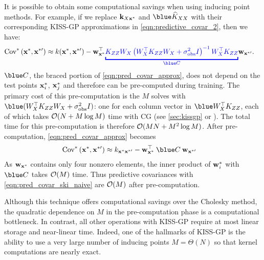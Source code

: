 It is possible to obtain some computational savings when using inducing point methods.
For example, if we replace $\mathbf{k}_{X \mathbf{x}^*}$ and $\blue \trainK$ with their corresponding KISS-GP approximations in \cref{eqn:predictive_covar_2}, then we have:
%
\begin{align}
  \covtest{\bxtest}{\bxtestprime}
  &\approx
  k(\bxtest, \bxtestprime) -
  \bw_{\bxtest}^{\top} {\color{blue}\underbracket{{\bK_{\bZ\bZ} \bW_{\bX} \left( \bW^\top_{\bX} \bK_{\bZ\bZ} \bW_\bX + \sigma^2_\text{obs} \bI \right)^{-1} \bW^\top_{\bX} \bK_{\bZ \bZ}}}_{\blue \bC}} \bw_{\bxtestprime}.
  \label{eqn:pred_covar_approx}
\end{align}
%
$\blue \bC$, the braced portion of \cref{eqn:pred_covar_approx}, does not depend on the test points $\mathbf{x}^*_{i}$, $\mathbf{x}^*_{j}$ and therefore can be pre-computed during training.
The primary cost of this pre-computation is the $M$ solves with $\blue (\bW_\bX^\top {\bK}_{\bZ\bZ} \bW_\bX + \sigma_\text{obs}^2 \bI)$: one for each column vector in $\blue \bW^{\top}_{\bX} \bK_{\bZ\bZ}$, each of which takes $\bigo{N + M\log M}$ time with CG (see \cref{sec:kissgp} or \citet{wilson2015kernel}).
The total time for this pre-computation is therefore $\bigo{MN + M^2 \log M}$.
After pre-computation, \cref{eqn:pred_covar_approx} becomes
%
\begin{align}
  \covtest{\bxtest}{\bxtestprime} &\approx k_{\bxtest \bxtestprime} - \bw_{\bxtest}^\top \: {\blue \bC} \: \bw_{\bxtestprime}
    \label{eqn:pred_covar_ski_naive}
\end{align}
As $\mathbf{w}_{\mathbf{x}^*}$ contains only four nonzero elements, the inner product of $\mathbf{w}^{*}_{i}$ with $\blue \bC$ takes $\bigo{M}$ time.
Thus predictive covariances with \cref{eqn:pred_covar_ski_naive} are $\bigo{M}$ after pre-computation.

Although this technique offers computational savings over the Cholesky method, the quadratic dependence on $M$ in the pre-computation phase is a computational bottleneck.
In contrast, all other operations with KISS-GP require at most linear storage and near-linear time.
Indeed, one of the hallmarks of KISS-GP is the ability to use a very large number of inducing points $M = \Theta(N)$ so that kernel computations are nearly exact.

